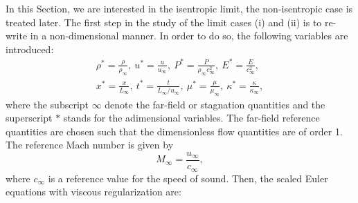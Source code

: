In this Section, we are interested in the isentropic limit, the non-isentropic case is treated later.
%
The first step in the study of the limit cases (i) and (ii) is to re-write  in a non-dimensional manner. In order to do so, the following variables are introduced:
%
\begin{multline}
\label{eq:norm_param}
\rho^*   = \frac{\rho}{\rho_\infty}           ,\
u^*      = \frac{u}{u_\infty}                 ,\
P^*      = \frac{P}{\rho_\infty c^2_\infty}   ,\
E^*      = \frac{E}{c^2_\infty }              ,\\
x^* = \frac{x}{L_\infty}                      ,\
t^* = \frac{t}{L_\infty / u_\infty}           ,\ 
\mu^*    = \frac{\mu}{\mu_\infty}             ,\
\kappa^* = \frac{\kappa}{\kappa_\infty}       ,
\end{multline}
%
where  the subscript $\infty$ denote the far-field or stagnation quantities and the superscript $*$ stands for the adimensional variables. The far-field reference quantities are chosen such that the dimensionless flow quantities are of order 1. The reference Mach number is given by
%
\begin{equation}
M_\infty = \frac{u_\infty}{c_\infty} ,
\end{equation}
%
where $c_\infty$ is a reference value for the speed of sound. Then, the scaled Euler equations with viscous regularization are:
%
